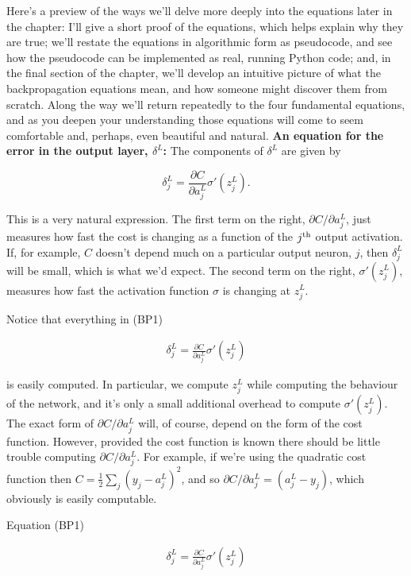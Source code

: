 Here's a preview of the ways we'll delve more deeply into the equations later in the chapter: I'll give a short proof of the equations, which helps explain why they are true; we'll restate the equations in algorithmic form as pseudocode, and see how the pseudocode can be implemented as real, running Python code; and, in the final section of the chapter, we'll develop an intuitive picture of what the backpropagation equations mean, and how someone might discover them from scratch. Along the way we'll return repeatedly to the four fundamental equations, and as you deepen your understanding those equations will come to seem comfortable and, perhaps, even beautiful and natural. \textbf{An equation for the error in the output layer, $\delta^L$:} The components of $\delta^L$ are given by

\begin{equation}
\delta^L_j = \frac{\partial C}{\partial a^L_j} \sigma'(z^L_j).
\tag{BP1}
\end{equation}

\noindent This is a very natural expression. The first term on the right, $\partial C / \partial a^L_j$, just measures how fast the cost is changing as a function of the $j^{\rm th}$ output activation. If, for example, $C$ doesn't depend much on a particular output neuron, $j$, then $\delta^L_j$ will be small, which is what we'd expect. The second term on the right, $\sigma'(z^L_j)$, measures how fast the activation function $\sigma$ is changing at $z^L_j$.


Notice that everything in (BP1)

\begin{align*}
\delta^L_j = \frac{\partial C}{\partial a^L_j} \sigma'(z^L_j) \nonumber
\end{align*}

\noindent is easily computed. In particular, we compute $z^L_j$ while computing the behaviour of the network, and it's only a small additional overhead to compute $\sigma'(z^L_j)$. The exact form of $\partial C / \partial a^L_j$ will, of course, depend on the form of the cost function. However, provided the cost function is known there should be little trouble computing $\partial C / \partial a^L_j$. For example, if we're using the quadratic cost function then $C = \frac{1}{2} \sum_j (y_j-a^L_j)^2$, and so $\partial C / \partial a^L_j = (a_j^L-y_j)$, which obviously is easily computable.


Equation (BP1)

\begin{align*}
\delta^L_j = \frac{\partial C}{\partial a^L_j} \sigma'(z^L_j) \nonumber
\end{align*}

